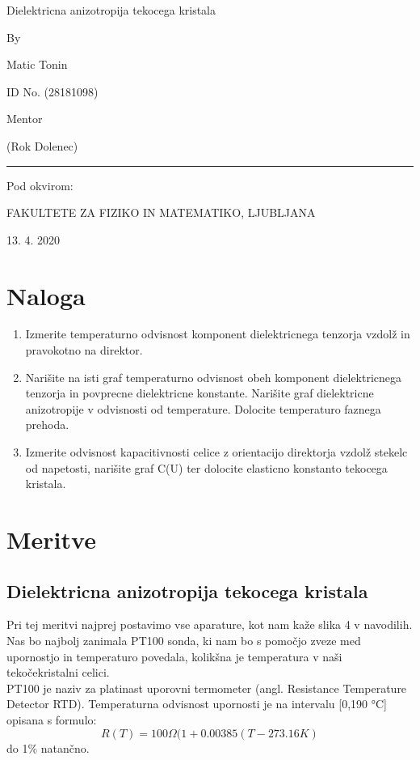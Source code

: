 \documentclass[11pt, a4paper]{article}
\theoremstyle{definition}
\theoremstyle{example}
\theoremstyle{izrek}
\begin{document}
\begin{center}
\thispagestyle{empty}
\parskip=14pt%
\vspace*{3\parskip}%
\begin{Huge} Dielektricna anizotropija tekocega kristala \end{Huge}

By

Matic Tonin

ID No. (28181098)

Mentor 

(Rok Dolenec)

\rule{7cm}{0.4pt}

Pod okvirom:

FAKULTETE ZA FIZIKO IN MATEMATIKO, LJUBLJANA

13. 4. 2020

\end{center}
\pagebreak

\section{Naloga}
\begin{enumerate}

\item Izmerite temperaturno odvisnost komponent dielektricnega tenzorja vzdolž in pravokotno
na direktor.
\item Narišite na isti graf temperaturno odvisnost obeh komponent dielektricnega tenzorja
in povprecne dielektricne konstante. Narišite graf dielektricne anizotropije v
odvisnosti od temperature. Dolocite temperaturo faznega prehoda.
\item Izmerite odvisnost kapacitivnosti celice z orientacijo direktorja vzdolž stekelc od
napetosti, narišite graf C(U) ter dolocite elasticno konstanto tekocega kristala.
\end{enumerate}


\section{Meritve}
\subsection{Dielektricna anizotropija tekocega kristala}
Pri tej meritvi najprej postavimo vse aparature, kot nam kaže slika 4 v navodilih. Nas bo najbolj zanimala PT100 sonda, ki nam bo s pomočjo zveze med upornostjo in temperaturo povedala, kolikšna je temperatura v naši tekočekristalni celici. \\
PT100 je naziv za platinast uporovni termometer (angl. Resistance Temperature Detector RTD). Temperaturna
odvisnost upornosti je na intervalu [0,190 °C] opisana s formulo:
\begin{equation}
\label{Temperatura, upor}
R(T)= 100 \Omega(1+ 0.00385(T-273.16K)
\end{equation}
do 1\% natančno.\\
\end{document}
